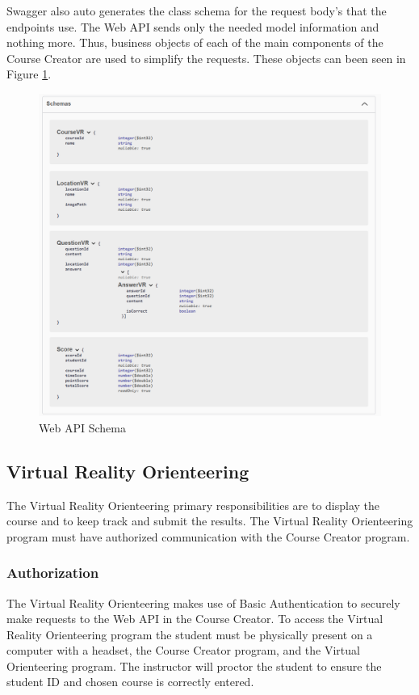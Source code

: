Swagger also auto generates the class schema for the request body's that the endpoints use. The Web API sends only the needed model information and nothing more. Thus, business objects of each of the main components of the Course Creator are used to simplify the requests. These objects can been seen in Figure \ref{fig:WebApiSchema}.
\begin{figure}[htb]
	\centering
	\includegraphics[width=.9\textwidth]{Implementation/assets/web-api-schema.png}
	\caption[Web API Schema]{\label{fig:WebApiSchema}Web API Schema}
\end{figure}

\subsection{Virtual Reality Orienteering}
The Virtual Reality Orienteering primary responsibilities are to display the course and to keep track and submit the results. The Virtual Reality Orienteering program must have authorized communication with the Course Creator program.

\subsubsection{Authorization}
The Virtual Reality Orienteering makes use of Basic Authentication to securely make requests to the Web API in the Course Creator. To access the Virtual Reality Orienteering program the student must be physically present on a computer with
a headset, the Course Creator program, and the Virtual Orienteering program. The instructor will proctor the student to ensure the student ID and chosen course is correctly entered. 

